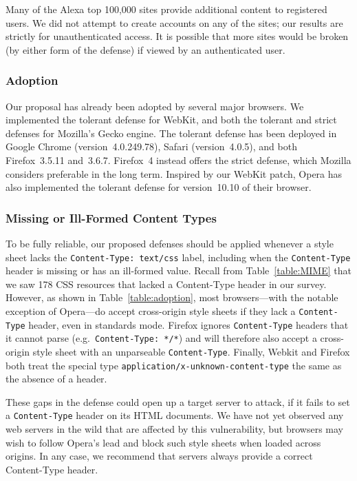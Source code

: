\documentclass{acm_proc_article-sp}
\begin{document}
Many of the Alexa top 100,000 sites provide additional content to
registered users.  We did not attempt to create accounts on any of the
sites; our results are strictly for unauthenticated access.  It is
possible that more sites would be broken (by either form of the
defense) if viewed by an authenticated user.

\subsubsection{Adoption}
Our proposal has already been adopted by several major browsers.  We
implemented the tolerant defense for WebKit, and both the tolerant and
strict defenses for Mozilla's Gecko engine.  The tolerant defense has
been deployed in Google Chrome (version~4.0.249.78), Safari
(version~4.0.5), and both Firefox~3.5.11 and~3.6.7.  Firefox~4 instead
offers the strict defense, which Mozilla considers preferable in the
long term.  Inspired by our WebKit patch, Opera has also implemented
the tolerant defense for version~10.10 of their browser.

\subsubsection{Missing or Ill-Formed Content Types}\label{sec:missing}
To be fully reliable, our proposed defenses should be applied whenever
a style sheet lacks the \verb|Content-Type: text/css| label, including
when the \texttt{Content-Type} header is missing or has an ill-formed
value.  Recall from Table~\ref{table:MIME} that we saw 178 CSS
resources that lacked a Content-Type header in our survey.  However,
as shown in Table~\ref{table:adoption}, most browsers---with the
notable exception of Opera---do accept cross-origin style sheets if
they lack a \texttt{Content-Type} header, even in standards mode.
Firefox ignores \texttt{Content-Type} headers that it cannot parse
(e.g.~\verb|Content-Type: */*|) and will therefore also accept a
cross-origin style sheet with an unparseable \texttt{Content-Type}.
Finally, Webkit and Firefox both treat the special type
\texttt{application/x-unknown-content-type} the same as the absence of
a header.

These gaps in the defense could open up a target server to attack, if
it fails to set a \texttt{Content-Type} header on its HTML
documents. We have not yet observed any web servers in the wild that
are affected by this vulnerability, but browsers may wish to follow
Opera's lead and block such style sheets when loaded across
origins. In any case, we recommend that servers always provide a
correct Content-Type header.
\end{document}
